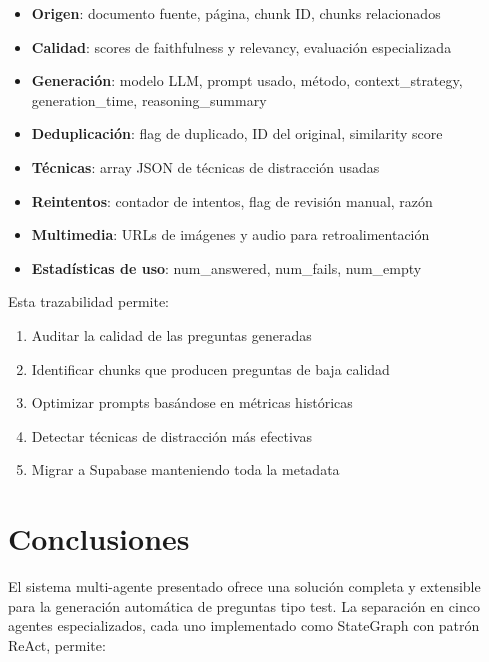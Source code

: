 \documentclass[10pt,twocolumn,letterpaper]{article}
\begin{document}
\begin{itemize}[nosep,leftmargin=*]
  \item \textbf{Origen}: documento fuente, p\'agina, chunk ID, chunks relacionados
  \item \textbf{Calidad}: scores de faithfulness y relevancy, evaluaci\'on especializada
  \item \textbf{Generaci\'on}: modelo LLM, prompt usado, m\'etodo, context\_strategy,
        generation\_time, reasoning\_summary
  \item \textbf{Deduplicaci\'on}: flag de duplicado, ID del original, similarity score
  \item \textbf{T\'ecnicas}: array JSON de t\'ecnicas de distracci\'on usadas
  \item \textbf{Reintentos}: contador de intentos, flag de revisi\'on manual, raz\'on
  \item \textbf{Multimedia}: URLs de im\'agenes y audio para retroalimentaci\'on
  \item \textbf{Estad\'isticas de uso}: num\_answered, num\_fails, num\_empty
\end{itemize}

Esta trazabilidad permite:
\begin{enumerate}[nosep,leftmargin=*]
  \item Auditar la calidad de las preguntas generadas
  \item Identificar chunks que producen preguntas de baja calidad
  \item Optimizar prompts bas\'andose en m\'etricas hist\'oricas
  \item Detectar t\'ecnicas de distracci\'on m\'as efectivas
  \item Migrar a Supabase manteniendo toda la metadata
\end{enumerate}

\section{Conclusiones}

El sistema multi-agente presentado ofrece una soluci\'on completa y extensible
para la generaci\'on autom\'atica de preguntas tipo test. La separaci\'on en cinco
agentes especializados, cada uno implementado como StateGraph con patr\'on ReAct,
permite:
\end{document}
